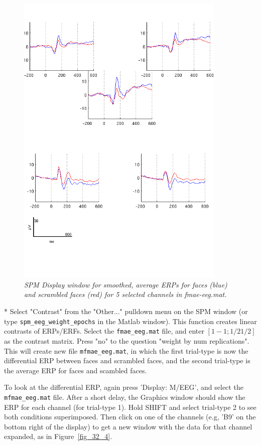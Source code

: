 \begin{figure}
\begin{center}
\includegraphics[width=100mm]{multimodal/figures/figure_32_3}
\caption{\em SPM Display window for smoothed, average ERPs for faces (blue) and scrambled faces (red) for 5 selected channels in fmae-eeg.mat. \label{fig_32_3}}
\end{center}
\end{figure}

* Select "Contrast" from the "Other..." pulldown menu on the SPM window (or type \verb!spm_eeg_weight_epochs! in the Matlab window). This function creates linear contrasts of ERPs/ERFs. Select the \verb!fmae_eeg.mat! file, and enter $[1 -1; 1/2 1/2]$ as the contrast matrix. Press "no" to the question "weight by num replications". This will create new file \verb!mfmae_eeg.mat!, in which the first trial-type is now the differential ERP between faces and scrambled faces, and the second trial-type is the average ERP for faces and scambled faces.

To look at the differential ERP, again press 'Display: M/EEG', and select the \verb!mfmae_eeg.mat! file. After a short delay, the Graphics window should show the ERP for each channel (for trial-type 1). Hold SHIFT and select trial-type 2 to see both conditions superimposed. Then click on one of the channels (e.g, 'B9' on the bottom right of the display) to get a new window with the data for that channel expanded, as in Figure~\ref{fig_32_4}.

